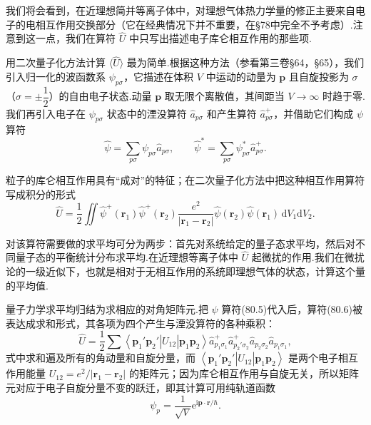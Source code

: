 我们将会看到，在近理想简并等离子体中，对理想气体热力学量的修正主要来自电子的电相互作用交换部分（它在经典情况下并不重要，在§78中完全不予考虑）.注意到这一点，我们在算符 $\hat{U}$ 中只写出描述电子库仑相互作用的那些项.

用二次量子化方法计算 $\langle\hat{U}\rangle$ 最为简单.根据这种方法（参看第三卷§64，§65），我们引入归一化的波函数系 $\psi_{p\sigma}$，它描述在体积 $V$ 中运动的动量为 $\boldsymbol{p}$ 且自旋投影为 $\sigma$（$\sigma=\pm\dfrac{1}{2}$）的自由电子状态.动量 $\boldsymbol{p}$ 取无限个离散值，其间距当 $V\to\infty$ 时趋于零.我们再引入电子在 $\psi_{p\sigma}$ 状态中的湮没算符 $\hat{a}_{p\sigma}$ 和产生算符 $\hat{a}^{+}_{p\sigma}$，并借助它们构成 $\psi$ 算符
\begin{equation}
  \hat{\psi}=\sum_{p\sigma}\psi_{p\sigma}\hat{a}_{p\sigma},\qquad
  \hat{\psi}^{*}=\sum_{p\sigma}\psi^{*}_{p\sigma}\hat{a}^{+}_{p\sigma}.
\end{equation}

粒子的库仑相互作用具有“成对”的特征；在二次量子化方法中把这种相互作用算符写成积分的形式
\begin{equation}
  \hat{U}=\frac{1}{2}\iint\hat{\psi}^{+}(\boldsymbol{r}_1)
  \hat{\psi}^{+}(\boldsymbol{r}_2)
  \frac{e^2}{\left|\boldsymbol{r}_1-\boldsymbol{r}_2\right|}
  \hat{\psi}(\boldsymbol{r}_2)\hat{\psi}(\boldsymbol{r}_1)\,
  \mathrm{d}V_1\mathrm{d}V_2.
\end{equation}

对该算符需要做的求平均可分为两步：首先对系统给定的量子态求平均，然后对不同量子态的平衡统计分布求平均.在近理想等离子体中 $\hat{U}$ 起微扰的作用.我们在微扰论的一级近似下，也就是相对于无相互作用的系统即理想气体的状态，计算这个量的平均值.

量子力学求平均归结为求相应的对角矩阵元.把 $\psi$ 算符(80.5)代入后，算符(80.6)被表达成求和形式，其各项为四个产生与湮没算符的各种乘积：
\begin{equation}
  \hat{U}=\frac{1}{2}\sum\left\langle\boldsymbol{p}_1'\boldsymbol{p}_2'\right|U_{12}
  \left|\boldsymbol{p}_1\boldsymbol{p}_2\right\rangle
  \hat{a}^{+}_{p_1\sigma_1}\hat{a}^{+}_{p_2'\sigma_2}
  \hat{a}_{p_2\sigma_2}\hat{a}_{p_1\sigma_1},
\end{equation}
式中求和遍及所有的角动量和自旋分量，而
$\left\langle\boldsymbol{p}_1'\boldsymbol{p}_2'\right|U_{12}
\left|\boldsymbol{p}_1\boldsymbol{p}_2\right\rangle$
是两个电子相互作用能量 $U_{12}=e^2/\left|\boldsymbol{r}_1-\boldsymbol{r}_2\right|$ 的矩阵元；因为库仑相互作用与自旋无关，所以矩阵元对应于电子自旋分量不变的跃迁，即其计算可用纯轨道函数
\begin{equation*}
  \psi_p=\frac{1}{\sqrt{V}}\mathrm{e}^{\mathrm{i}\boldsymbol{p}\cdot\boldsymbol{r}/\hbar}.
\end{equation*}

